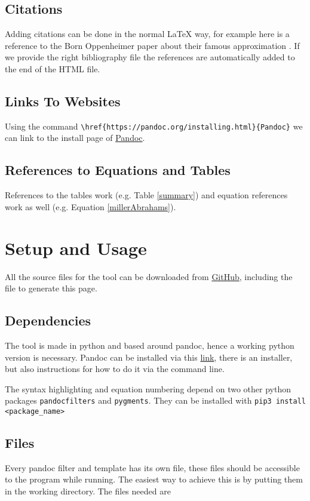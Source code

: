 \documentclass[11pt, a4paper]{article}
\begin{document}
	\subsection{Citations}
	Adding citations can be done in the normal LaTeX way, for example here is a reference to the Born Oppenheimer paper about their famous approximation \cite{Born1927}. If we provide the right bibliography file the references are automatically added to the end of the HTML file.
	
	\subsection{Links To Websites}
	Using the command \lstinline|\href{https://pandoc.org/installing.html}{Pandoc}| we can link to the install page of \href{https://pandoc.org/installing.html}{Pandoc}.
	
	\subsection{References to Equations and Tables}
	References to the tables work (e.g. Table \ref{summary}) and equation references work as well (e.g. Equation \ref{millerAbrahams}).
	
	\section{Setup and Usage}
	All the source files for the tool can be downloaded from \href{https://github.com/rubengerritsen/LatexToCanvas}{GitHub}, including the file to generate this page.
	
	\subsection{Dependencies}
	The tool is made in python and based around pandoc, hence a working python version is necessary. Pandoc can be installed via this \href{https://pandoc.org/installing.html}{link}, there is an installer, but also instructions for how to do it via the command line.
	
	The syntax highlighting and equation numbering depend on two other python packages \lstinline{pandocfilters} and \lstinline{pygments}. They can be installed with \lstinline|pip3 install <package_name>|
	
	\subsection{Files}
	Every pandoc filter and template has its own file, these files should be accessible to the program while running. The easiest way to achieve this is by putting them in the working directory. The files needed are
	
\end{document}
